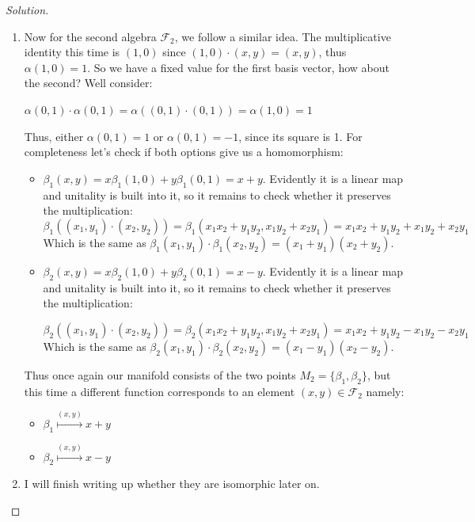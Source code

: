 \documentclass[11pt,a4paper]{article}
\theoremstyle{plain}
\theoremstyle{definition}
\theoremstyle{remark}
\newenvironment{solution}
  {\begin{proof}[Solution]}
  {\end{proof}}
\newcommand{\F}{\mathcal{F}}            %
\begin{document}
\begin{solution}
\begin{enumerate}
    \begin{itemize}
      \item $\alpha_1 \overset{(x,y)}{\mapsto} x$
      \item $\alpha_2  \overset{(x,y)}{\mapsto} y$
    \end{itemize}


  \item Now for the second algebra $\F_2$, we follow a similar idea. The multiplicative identity this time is $(1,0)$ since $(1,0)\cdot (x,y)=(x,y)$, thus $\alpha(1,0)=1$. So we have a fixed value for the first basis vector, how about the second? Well consider:

    $\alpha(0,1)\cdot \alpha(0,1)=\alpha((0,1)\cdot (0,1))=\alpha(1,0)=1$

  Thus, either $\alpha(0,1)=1$ or $\alpha(0,1)=-1$, since its square is 1. For completeness let's check if both options give us a homomorphism:

  \begin{itemize}
    \item $\beta_1 (x,y)=x\beta_1(1,0)+y\beta_1(0,1)=x+y$. Evidently it is a linear map and unitality is built into it, so it remains to check whether it preserves the multiplication:
      $$\beta_1((x_1,y_1)\cdot (x_2, y_2))= \beta_1(x_1x_2+y_1y_2, x_1y_2+ x_2y_1)= x_1x_2+y_1y_2+x_1y_2+x_2y_1$$
    Which is the same as $\beta_1(x_1,y_1)\cdot\beta_1(x_2,y_2)=(x_1+y_1)(x_2+y_2)$.

    \item $\beta_2 (x,y)=x\beta_2(1,0)+y\beta_2(0,1)=x-y$. Evidently it is a linear map and unitality is built into it, so it remains to check whether it preserves the multiplication:


      $$\beta_2((x_1,y_1)\cdot (x_2, y_2))= \beta_2(x_1x_2+y_1y_2, x_1y_2+ x_2y_1)= x_1x_2+y_1y_2-x_1y_2-x_2y_1$$
    Which is the same as $\beta_2(x_1,y_1)\cdot\beta_2(x_2,y_2)=(x_1-y_1)(x_2-y_2)$.
  \end{itemize}

  Thus once again our manifold consists of the two points $M_2=\{\beta_1, \beta_2\}$, but this time a different function corresponds to an element $(x,y)\in \F_2$ namely:

    \begin{itemize}
      \item $\beta_1 \overset{(x,y)}{\mapsto} x+y$
      \item $\beta_2  \overset{(x,y)}{\mapsto} x-y$
    \end{itemize}


  \item I will finish writing up whether they are isomorphic later on.
\end{enumerate}
\end{solution}
\end{document}
